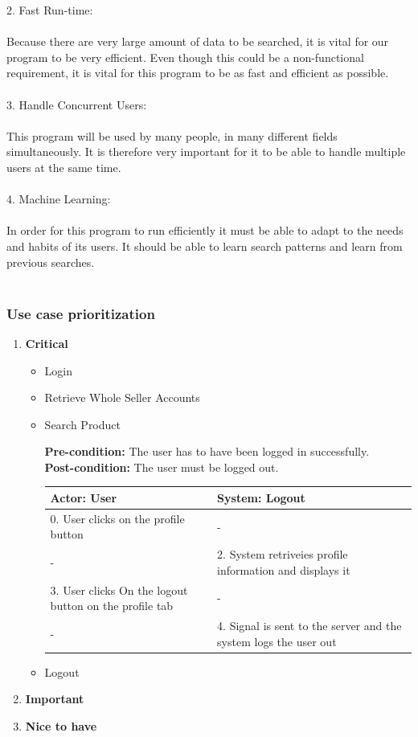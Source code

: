 \documentclass[a4paper,10pt]{article}
\begin{document}
	2.	Fast Run-time:\\\\
	Because there are very large amount of data to be searched, it is vital for our program to be very efficient.  Even though this could be a non-functional requirement, it is vital for this program to be as fast and efficient as possible.\\\\
	
	3.	Handle Concurrent Users:\\\\
	This program will be used by many people, in many different fields simultaneously. It is therefore very important for it to be able to handle multiple users at the same time.\\\\
	
	4.	Machine Learning:\\\\
	In order for this program to run efficiently it must be able to adapt to the needs and habits of its users. It should be able to learn search patterns and learn from previous searches.\\\\
	
	\subsubsection{Use case prioritization} 
		\begin{enumerate} 
		\item \textbf{Critical} 
			\begin{itemize} 
				\item Login
				\item Retrieve Whole Seller Accounts 
				\item Search Product 
				
				\textbf{Pre-condition: } The user has to have been logged in successfully.  \\
				\textbf{Post-condition: } The user must be logged out. \\
				\begin{center}
				\begin{tabular}{ |p{8cm}|p{8cm}| }
				 \hline
  				\textbf{Actor:} User & \textbf{System:} Logout \\
				 \hline
				 0. User clicks on the profile button & - \\
				 \hline
				- & 2. System retriveies profile information and displays it\\
				 \hline
				 3. User clicks On the logout button on the profile tab & - \\
				 \hline
				- & 4. Signal is sent to the server and the system logs the user out\\
				 \hline
				\end{tabular}
				\end{center}
				\item Logout
			\end{itemize} 
		\item \textbf{Important} 

		\item \textbf{Nice to have} 
		\end{enumerate} 
\end{document}
